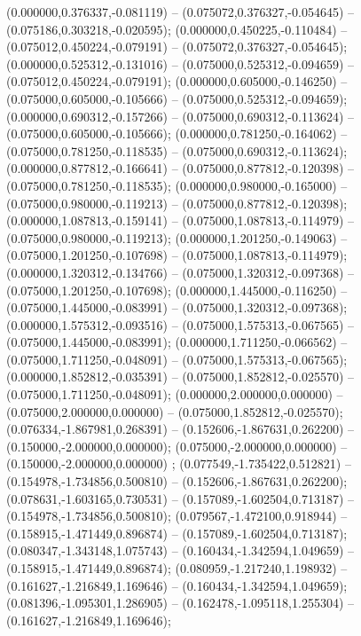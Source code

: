  (0.000000,0.376337,-0.081119) -- (0.075072,0.376327,-0.054645) -- (0.075186,0.303218,-0.020595);
 (0.000000,0.450225,-0.110484) -- (0.075012,0.450224,-0.079191) -- (0.075072,0.376327,-0.054645);
 (0.000000,0.525312,-0.131016) -- (0.075000,0.525312,-0.094659) -- (0.075012,0.450224,-0.079191);
 (0.000000,0.605000,-0.146250) -- (0.075000,0.605000,-0.105666) -- (0.075000,0.525312,-0.094659);
 (0.000000,0.690312,-0.157266) -- (0.075000,0.690312,-0.113624) -- (0.075000,0.605000,-0.105666);
 (0.000000,0.781250,-0.164062) -- (0.075000,0.781250,-0.118535) -- (0.075000,0.690312,-0.113624);
 (0.000000,0.877812,-0.166641) -- (0.075000,0.877812,-0.120398) -- (0.075000,0.781250,-0.118535);
 (0.000000,0.980000,-0.165000) -- (0.075000,0.980000,-0.119213) -- (0.075000,0.877812,-0.120398);
 (0.000000,1.087813,-0.159141) -- (0.075000,1.087813,-0.114979) -- (0.075000,0.980000,-0.119213);
 (0.000000,1.201250,-0.149063) -- (0.075000,1.201250,-0.107698) -- (0.075000,1.087813,-0.114979);
 (0.000000,1.320312,-0.134766) -- (0.075000,1.320312,-0.097368) -- (0.075000,1.201250,-0.107698);
 (0.000000,1.445000,-0.116250) -- (0.075000,1.445000,-0.083991) -- (0.075000,1.320312,-0.097368);
 (0.000000,1.575312,-0.093516) -- (0.075000,1.575313,-0.067565) -- (0.075000,1.445000,-0.083991);
 (0.000000,1.711250,-0.066562) -- (0.075000,1.711250,-0.048091) -- (0.075000,1.575313,-0.067565);
 (0.000000,1.852812,-0.035391) -- (0.075000,1.852812,-0.025570) -- (0.075000,1.711250,-0.048091);
 (0.000000,2.000000,0.000000) -- (0.075000,2.000000,0.000000) -- (0.075000,1.852812,-0.025570);
 (0.076334,-1.867981,0.268391) -- (0.152606,-1.867631,0.262200) -- (0.150000,-2.000000,0.000000);
 (0.075000,-2.000000,0.000000) -- (0.150000,-2.000000,0.000000) ;
 (0.077549,-1.735422,0.512821) -- (0.154978,-1.734856,0.500810) -- (0.152606,-1.867631,0.262200);
 (0.078631,-1.603165,0.730531) -- (0.157089,-1.602504,0.713187) -- (0.154978,-1.734856,0.500810);
 (0.079567,-1.472100,0.918944) -- (0.158915,-1.471449,0.896874) -- (0.157089,-1.602504,0.713187);
 (0.080347,-1.343148,1.075743) -- (0.160434,-1.342594,1.049659) -- (0.158915,-1.471449,0.896874);
 (0.080959,-1.217240,1.198932) -- (0.161627,-1.216849,1.169646) -- (0.160434,-1.342594,1.049659);
 (0.081396,-1.095301,1.286905) -- (0.162478,-1.095118,1.255304) -- (0.161627,-1.216849,1.169646);
